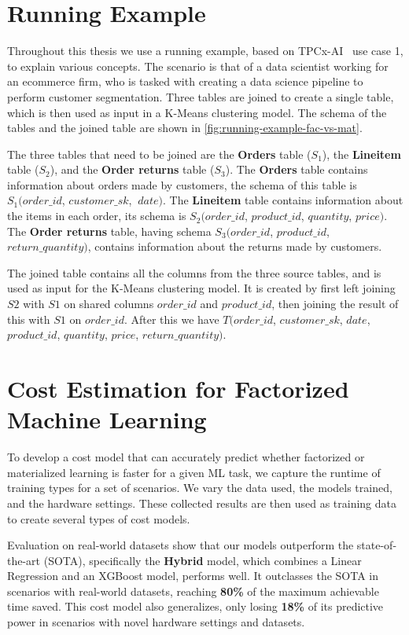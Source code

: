 \section{Running Example}
Throughout this thesis we use a running example, based on TPCx-AI~\cite{tpcx-ai} use case 1, to explain various concepts. The scenario is that of a data scientist working for an ecommerce firm, who is tasked with creating a data science pipeline to perform customer segmentation. Three tables are joined to create a single table, which is then used as input in a K-Means clustering model. The schema of the tables and the joined table are shown in \autoref{fig:running-example-fac-vs-mat}.

The three tables that need to be joined are the \textbf{Orders} table ($S_1$), the \textbf{Lineitem} table ($S_2$), and the \textbf{Order returns} table ($S_3$). The \textbf{Orders} table contains information about orders made by customers, the schema of this table is $S_1(order\_id$, $customer\_sk$, $\ date)$. The \textbf{Lineitem} table contains information about the items in each order, its schema is $S_2(order\_id$, $product\_id$, $quantity$,  $price)$. The \textbf{Order returns} table, having schema $S_3(order\_id$, $product\_id$, $return\_quantity)$, contains information about the returns made by customers.

The joined table contains all the columns from the three source tables, and is used as input for the K-Means clustering model. It is created by first left joining $S2$ with $S1$ on shared columns $order\_id$ and $product\_id$, then joining the result of this with $S1$ on $order\_id$. After this we have $T(order\_id$, $customer\_sk$, $date$, $product\_id$, $quantity$, $price$, $return\_quantity)$.

\section{Cost Estimation for Factorized Machine Learning}
To develop a cost model that can accurately predict whether factorized or materialized learning is faster for a given ML task, we capture the runtime of training types for a set of scenarios. We vary the data used, the models trained, and the hardware settings. These collected results are then used as training data to create several types of cost models.

Evaluation on real-world datasets show that our models outperform the state-of-the-art (SOTA), specifically the \textbf{Hybrid} model, which combines a Linear Regression and an XGBoost model, performs well. It outclasses the SOTA in scenarios with real-world datasets, reaching \textbf{80\%} of the maximum achievable time saved. This cost model also generalizes, only losing \textbf{18\%} of its predictive power in scenarios with novel hardware settings and datasets.

